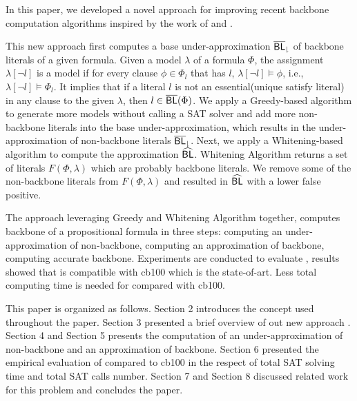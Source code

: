 In this paper, we developed a novel approach \tool for improving recent backbone computation algorithms inspired by the work of \cite{Z11} and \cite{JLM15}.

This new approach first computes a base under-approximation ${\sf \overline{BL}_\downharpoonright}$ of backbone literals of a given formula. Given a model $\lambda$ of a formula $\Phi$, the assignment $\lambda[\neg l]$ is a model if for every clause $\phi\in\Phi_l$ that has $l$, $\lambda[\neg l]\models\phi$, i.e., $\lambda[\neg l]\models\Phi_l$. It implies that if a literal $l$ is not an essential(unique satisfy literal) in any clause to the given $\lambda$, then $l\in\overline{\textsf{BL}}(\Phi)$. We apply a Greedy-based algorithm to generate more models without calling a SAT solver and add more non-backbone literals into the base under-approximation, which results in the under-approximation of non-backbone literals ${\sf \overline{BL}_\downharpoonright}$.
Next, we apply a Whitening-based algorithm to compute the approximation ${\sf \widehat{BL}}$. Whitening Algorithm returns a set of literals $F(\Phi, \lambda)$ which are probably backbone literals. We remove some of the non-backbone literals from $F(\Phi, \lambda)$ and resulted in ${\sf \widehat{BL}}$ with a lower false positive. 

The approach \tool leveraging Greedy and Whitening Algorithm together, computes backbone of a propositional formula in three steps: computing an under-approximation of non-backbone, computing an approximation of backbone, computing accurate backbone. Experiments are conducted to evaluate \tool, results showed that \tool is compatible with cb100 which is the state-of-art. Less total computing time is needed for \tool compared with cb100.


This paper is organized as follows.
Section 2 introduces the concept used throughout the paper.
Section 3 presented a brief overview of out new approach \tool.
Section 4 and Section 5 presents the computation of an under-approximation of non-backbone and an approximation of backbone.
Section 6 presented the empirical evaluation of \tool compared to cb100 in the respect of total SAT solving time and total SAT calls number.
Section 7 and Section 8 discussed related work for this problem and concludes the paper.
